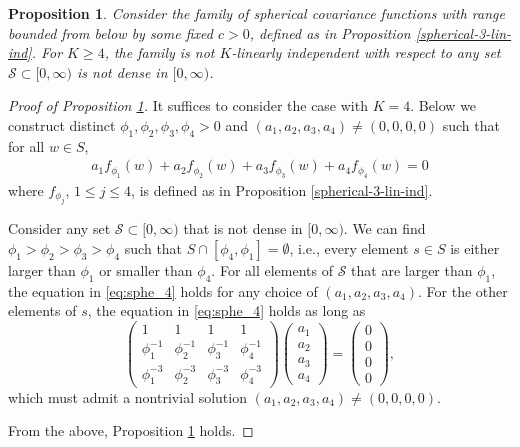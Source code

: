 \documentclass[11pt]{article}
\newtheorem{proposition}{Proposition}
\theoremstyle{definition}
\theoremstyle{remark}
\begin{document}
\begin{proposition}\label{spherical-4-non-lin-ind}
Consider the family of spherical covariance functions with range bounded from below by some fixed $c>0$, defined as in Proposition \ref{spherical-3-lin-ind}. 
For $K \ge 4$, the family is not $K$-linearly independent with respect to any set $\mathcal{S}\subset [0, \infty)$ is not dense in $[0, \infty)$.


\end{proposition} 
\begin{proof}[Proof of Proposition \ref{spherical-4-non-lin-ind}]
It suffices to consider the case with $K=4$. 
Below we 
construct distinct $\phi_1,\phi_2,\phi_3, \phi_4 >0$ and $(a_1, a_2, a_3, a_4) \neq (0,0,0,0)$ such that for all $w \in S$,
\begin{align}\label{eq:sphe_4}
    a_1f_{\phi_1}(w) + a_2f_{\phi_2}(w) + a_3f_{\phi_3}(w) + a_4f_{\phi_4}(w) = 0
\end{align}
where $f_{\phi_j}$, $1\le j \le 4$, is defined as in Proposition \ref{spherical-3-lin-ind}. 


Consider any set $\mathcal{S}\subset [0, \infty)$ that is not dense in $[0, \infty)$.
We can find $\phi_1 > \phi_2> \phi_3> \phi_4$ such that $S\cap [\phi_4, \phi_1] = \emptyset$, i.e., 
every element $s\in S$ is either larger than $\phi_1$ or smaller than $\phi_4$. For all elements of $\mathcal{S}$ that are larger than $\phi_1$, the equation in \eqref{eq:sphe_4} holds for any choice of $(a_1, a_2, a_3, a_4)$. For the other elements of $s$, 
the equation in \eqref{eq:sphe_4} holds as long as 
\[\begin{pmatrix} 1 & 1 & 1 & 1\\
\phi_1^{-1} & \phi_2^{-1} & \phi_3^{-1} & \phi_4^{-1}\\
\phi_1^{-3} & \phi_2^{-3} & \phi_3^{-3} & \phi_4^{-3}\end{pmatrix} \begin{pmatrix}a_1 \\ a_2 \\ a_3 \\ a_4\end{pmatrix} = \begin{pmatrix} 0 \\ 0 \\ 0 \\ 0 \end{pmatrix},   \]
which must admit a nontrivial solution $(a_1, a_2, a_3, a_4) \neq (0,0,0,0)$. 


From the above, Proposition \ref{spherical-4-non-lin-ind} holds. 
\end{proof}
\end{document}

